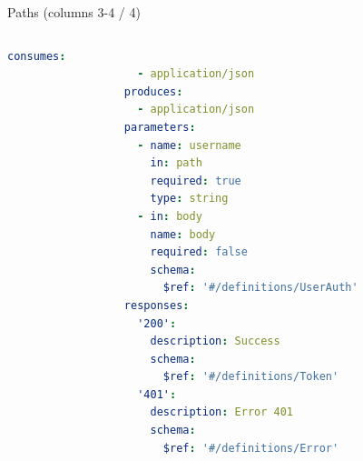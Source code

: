 \begin{frame}
\begin{exampleblock}{Paths (columns 3-4 / 4)}
\begin{columns}
		\begin{column}{0.48\textwidth}
		\begin{lstlisting}[language=yaml,basicstyle=\tiny]
			      consumes:
			        - application/json
			      produces:
			        - application/json
			      parameters:
			        - name: username
			          in: path
			          required: true
			          type: string
			        - in: body
			          name: body
			          required: false
			          schema:
			            $ref: '#/definitions/UserAuth'
			      responses:
			        '200':
			          description: Success
			          schema:
			            $ref: '#/definitions/Token'
			        '401':
			          description: Error 401
			          schema:
			            $ref: '#/definitions/Error'
		\end{lstlisting}
		\end{column}
		
		\end{columns}
	\end{exampleblock}

\end{frame}